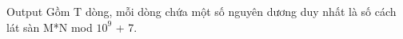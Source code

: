 Output
Gồm T dòng, mỗi dòng chứa một số nguyên dương duy nhất là số cách lát sàn M*N mod $10^{9}$   + 7.